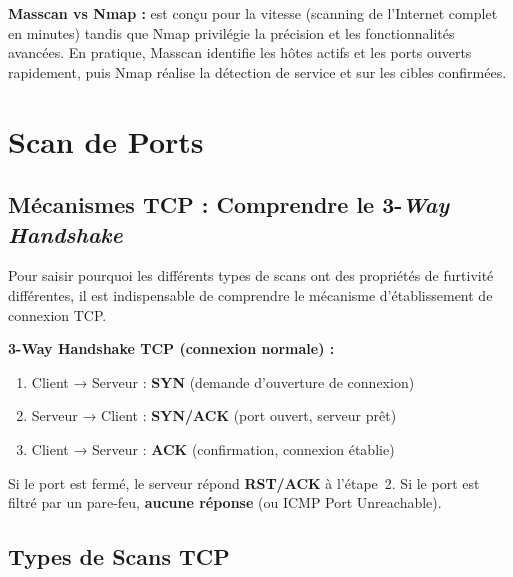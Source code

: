 \begin{boxinfo}
\textbf{Masscan vs Nmap :}  est conçu pour la vitesse
(scanning de l'Internet complet en minutes) tandis que Nmap privilégie la
précision et les fonctionnalités avancées. En pratique, Masscan identifie
les hôtes actifs et les ports ouverts rapidement, puis Nmap réalise la
détection de service et  sur les cibles confirmées.
\end{boxinfo}

\section{Scan de Ports}
\label{sec:port_scanning}

\subsection{Mécanismes TCP : Comprendre le 3-\textit{Way Handshake}}
\label{subsec:tcp_mecanique}

Pour saisir pourquoi les différents types de scans ont des propriétés de
furtivité différentes, il est indispensable de comprendre le mécanisme
d'établissement de connexion TCP.

\begin{boxinfo}
\textbf{3-Way Handshake TCP (connexion normale) :}
\begin{enumerate}
    \item Client → Serveur : \textbf{SYN} (demande d'ouverture de connexion)
    \item Serveur → Client : \textbf{SYN/ACK} (port ouvert, serveur prêt)
    \item Client → Serveur : \textbf{ACK} (confirmation, connexion établie)
\end{enumerate}
Si le port est fermé, le serveur répond \textbf{RST/ACK} à l'étape~2.
Si le port est filtré par un pare-feu, \textbf{aucune réponse} (ou ICMP
Port Unreachable).
\end{boxinfo}

\subsection{Types de Scans TCP}
\label{subsec:scan_types}

